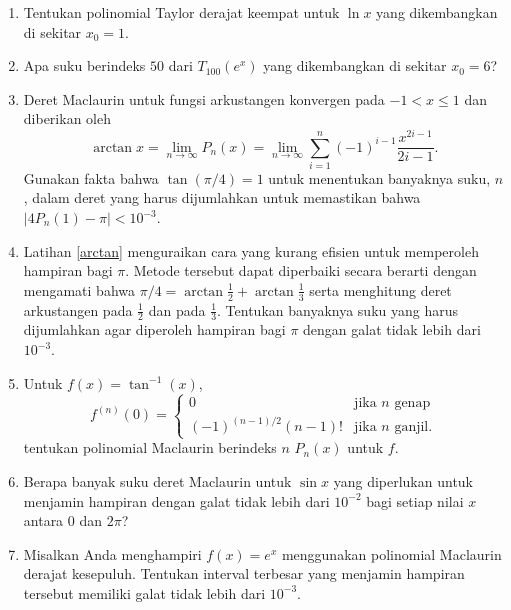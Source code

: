 \begin{enumerate}
\begin{enumerate}
\item Tentukan polinomial Maclaurin berindeks $n$ $P_{n}(x)$ untuk $f(x)$.
\item Tentukan batas galat ketika $P_{4}(2)$ digunakan untuk menghampiri
$f(2)$.
\item Berapa banyak suku polinomial Maclaurin yang perlu digunakan untuk
menghampiri $f(2)$ dengan galat tidak lebih dari $10^{-10}$? Dengan
kata lain, untuk nilai $n$ berapakah $P_{n}(2)$ memiliki batas galat
yang kurang dari atau sama dengan $10^{-10}$?
\end{enumerate}
\item Tentukan polinomial Taylor derajat keempat untuk $\ln x$ yang dikembangkan
di sekitar $x_{0}=1$. 
\item Apa suku berindeks $50$ dari $T_{100}(e^{x})$ yang dikembangkan
di sekitar $x_{0}=6$?
\item \label{arctan}Deret Maclaurin untuk fungsi arkustangen konvergen
pada $-1<x\leq1$ dan diberikan oleh
\[
\arctan x=\lim_{n\to\infty}P_{n}(x)=\lim_{n\to\infty}\sum_{i=1}^{n}(-1)^{i-1}\frac{x^{2i-1}}{2i-1}.
\]
Gunakan fakta bahwa $\tan(\pi/4)=1$ untuk menentukan banyaknya suku,
$n$, dalam deret yang harus dijumlahkan untuk memastikan bahwa $|4P_{n}(1)-\pi|<10^{-3}$.
\item Latihan \ref{arctan} menguraikan cara yang kurang efisien untuk memperoleh
hampiran bagi $\pi$. Metode tersebut dapat diperbaiki secara berarti
dengan mengamati bahwa $\pi/4=\arctan\frac{1}{2}+\arctan\frac{1}{3}$
serta menghitung deret arkustangen pada $\frac{1}{2}$ dan pada $\frac{1}{3}$.
Tentukan banyaknya suku yang harus dijumlahkan agar diperoleh hampiran
bagi $\pi$ dengan galat tidak lebih dari $10^{-3}$.
\item Untuk $f(x)=\tan^{-1}(x)$, 
\[
f^{(n)}(0)=\begin{cases}
0 & \textrm{jika }n\textrm{ genap}\\
(-1)^{(n-1)/2}(n-1)! & \textrm{jika }n\textrm{ ganjil}.
\end{cases}
\]
tentukan polinomial Maclaurin berindeks $n$ $P_{n}(x)$ untuk $f$.
\item Berapa banyak suku deret Maclaurin untuk $\sin x$ yang diperlukan
untuk menjamin hampiran dengan galat tidak lebih dari $10^{-2}$ bagi
setiap nilai $x$ antara 0 dan $2\pi$?
\item Misalkan Anda menghampiri $f(x)=e^{x}$ menggunakan polinomial Maclaurin
derajat kesepuluh. Tentukan interval terbesar yang menjamin hampiran
tersebut memiliki galat tidak lebih dari $10^{-3}$.

\end{enumerate}
